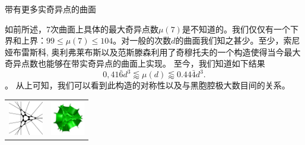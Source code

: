 ﻿\begin{surferPage}[216奇异点]{带有更多实奇异点的曲面}

如前所述，7次曲面上具体的最大奇异点数$\mu(7)$是不知道的。我们仅仅有一个下界和上界：$99\le \mu(7) \le 104$。对一般的次数$d$的曲面我们知之甚少。至少，索尼娅布雷斯科, 奥利弗莱布斯以及范斯滕森利用了奇穆托夫的一个构造使得当今最大奇异点数也能够在带实奇异点的曲面上实现。
至今，我们知道如下结果\[0,41\bar{6}d^3 \lessapprox \mu(d) \lessapprox 0.44\bar{4} d^3.\]。
从上可知，我们可以看到此构造的对称性以及与黑胞腔极大数目间的关系。
 \begin{center}
      \begin{tabular}{c@{\qquad}c}
        \includegraphics[height=1.5cm]{./../../common/images/vielesing.pdf}
        &
        \includegraphics[height=1.5cm]{./../../common/images/p9surface_von_oben}
      \end{tabular}
    \end{center}
\end{surferPage}

